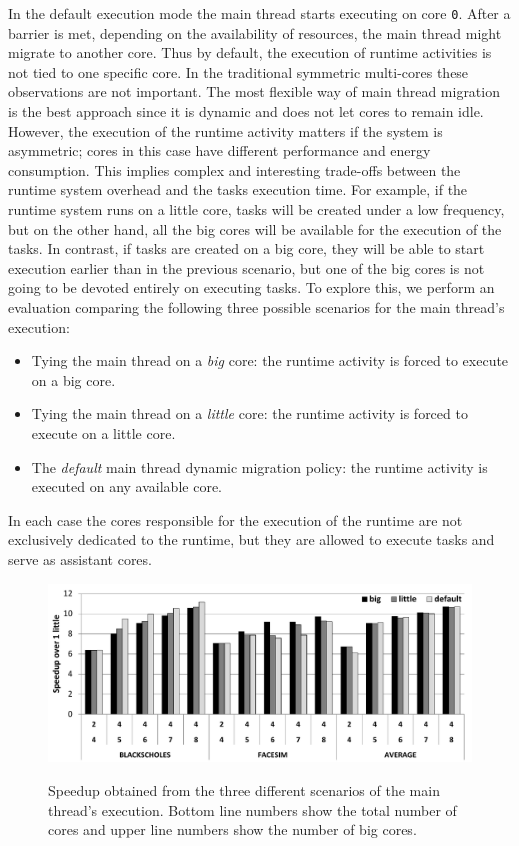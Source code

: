 In the default execution mode the main thread starts executing on core \texttt{0}. 
After a barrier is met, depending on the availability of resources, the main thread might migrate to another core. Thus by default, the execution of runtime activities is not tied to one specific core.
In the traditional symmetric multi-cores these observations are not important. 
The most flexible way of main thread migration is the best approach since it is dynamic and does not let cores to remain idle.
However, the execution of the runtime activity matters if the system is asymmetric; cores in this case have different performance and energy consumption. 
This implies complex and interesting trade-offs between the runtime system overhead and the tasks execution time.
For example, if the runtime system runs on a little core, tasks will be created under a low frequency, but on the other hand, all the big cores will be available for the execution of the tasks.
In contrast, if tasks are created on a big core, they will be able to start execution earlier than in the previous scenario, but one of the big cores is not going to be devoted entirely on executing tasks.
To explore this, we perform an evaluation comparing the following three possible scenarios for the main thread's execution:
\begin{itemize}
\item Tying the main thread on a \emph{big} core: the runtime activity is forced to execute on a big core.
\item Tying the main thread on a \emph{little} core: the runtime activity is forced to execute on a little core.
\item The \emph{default} main thread dynamic migration policy: the runtime activity is executed on any available core.
\end{itemize}
In each case the cores responsible for the execution of the runtime are not exclusively dedicated to the runtime, but they are allowed to execute tasks and serve as assistant cores.

\begin{figure}
        \centering
        \includegraphics[width=\columnwidth]{figures/speedup-def-big-little}\\%
	\caption{Speedup obtained from the three different scenarios of the main thread's execution. Bottom line numbers show the total number of cores and upper line numbers show the number of big cores.}%
        \label{fig:speedup-def-big-little}%
\end{figure}


